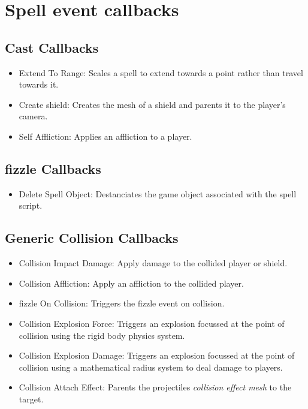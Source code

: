 \documentclass[12pt,a4paper]{report}
\begin{document}
\section{Spell event callbacks} \label{spellEvents}

\subsection{Cast Callbacks}

\begin{itemize}
    \item Extend To Range: Scales a spell to extend towards a point rather than travel towards it.
    \item Create shield: Creates the mesh of a shield and parents it to the player's camera.
    \item Self Affliction: Applies an affliction to a player.
\end{itemize}

\subsection{\gls{fizzle} Callbacks}

\begin{itemize}
    \item Delete Spell Object: Destanciates the game object associated with the spell script.
\end{itemize}

\subsection{Generic Collision Callbacks}

\begin{itemize}
    \item Collision Impact Damage: Apply damage to the collided player or shield.
    \item Collision Affliction: Apply an affliction to the collided player.
    \item \gls{fizzle} On Collision: Triggers the \gls{fizzle} event on collision.
    \item Collision Explosion Force: Triggers an explosion focussed at the point of collision using the rigid body physics system.
    \item Collision Explosion Damage: Triggers an explosion focussed at the point of collision using a mathematical radius system to deal damage to players.
    \item Collision Attach Effect: Parents the projectiles \textit{collision effect mesh} to the target.
\end{itemize}
\end{document}

